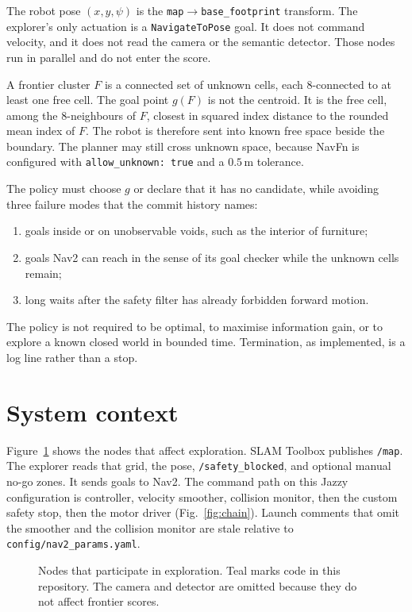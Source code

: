 \documentclass[11pt]{article}
\begin{document}
The robot pose $(x,y,\psi)$ is the \texttt{map}$\rightarrow$\texttt{base\_footprint} transform. The explorer's only actuation is a \texttt{NavigateToPose} goal. It does not command velocity, and it does not read the camera or the semantic detector. Those nodes run in parallel and do not enter the score.

A frontier cluster $F$ is a connected set of unknown cells, each 8-connected to at least one free cell. The goal point $g(F)$ is not the centroid. It is the free cell, among the 8-neighbours of $F$, closest in squared index distance to the rounded mean index of $F$. The robot is therefore sent into known free space beside the boundary. The planner may still cross unknown space, because NavFn is configured with \texttt{allow\_unknown: true} and a $0.5$\,m tolerance.

The policy must choose $g$ or declare that it has no candidate, while avoiding three failure modes that the commit history names:
\begin{enumerate}
\item goals inside or on unobservable voids, such as the interior of furniture;
\item goals Nav2 can reach in the sense of its goal checker while the unknown cells remain;
\item long waits after the safety filter has already forbidden forward motion.
\end{enumerate}
The policy is not required to be optimal, to maximise information gain, or to explore a known closed world in bounded time. Termination, as implemented, is a log line rather than a stop.

\section{System context}
Figure~\ref{fig:arch} shows the nodes that affect exploration. SLAM Toolbox publishes \texttt{/map}. The explorer reads that grid, the pose, \texttt{/safety\_blocked}, and optional manual no-go zones. It sends goals to Nav2. The command path on this Jazzy configuration is controller, velocity smoother, collision monitor, then the custom safety stop, then the motor driver (Fig.~\ref{fig:chain}). Launch comments that omit the smoother and the collision monitor are stale relative to \texttt{config/nav2\_params.yaml}.

\begin{figure}[ht]
\centering
\FigArchitecture
\caption{Nodes that participate in exploration. Teal marks code in this repository. The camera and detector are omitted because they do not affect frontier scores.}
\label{fig:arch}
\end{figure}
\end{document}
